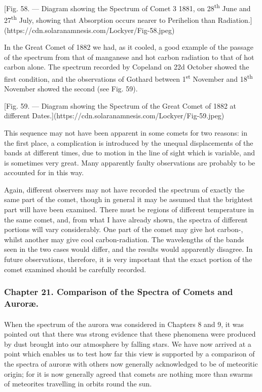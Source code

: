 \documentclass[a4paper, 12pt, oneside, polutonikogreek, english]{article}
\begin{document}
[Fig. 58. --- Diagram showing the Spectrum of Comet 3 1881, on 28\textsuperscript{th} June and 27\textsuperscript{th} July, showing that Absorption occurs nearer to Perihelion than Radiation.](https://cdn.solaranamnesis.com/Lockyer/Fig-58.jpeg)

In the Great Comet of 1882 we had, as it cooled, a good example of the passage of the spectrum from that of manganese and hot carbon radiation to that of hot carbon alone. The spectrum recorded by Copeland on 22d October showed the first condition, and the observations of Gothard between 1\textsuperscript{st} November and 18\textsuperscript{th} November showed the second (see Fig. 59).

[Fig. 59. --- Diagram showing the Spectrum of the Great Comet of 1882 at different Dates.](https://cdn.solaranamnesis.com/Lockyer/Fig-59.jpeg)

This sequence may not have been apparent in some comets for two reasons: in the first place, a complication is introduced by the unequal displacements of the bands at different times, due to motion in the line of sight which is variable, and is sometimes very great. Many apparently faulty observations are probably to be accounted for in this way.

Again, different observers may not have recorded the spectrum of exactly the same part of the comet, though in general it may be assumed that the brightest part will have been examined. There must be regions of different temperature in the same comet, and, from what I have already shown, the spectra of different portions will vary considerably. One part of the comet may give hot carbon-, whilst another may give cool carbon-radiation. The wavelengths of the bands seen in the two cases would differ, and the results would apparently disagree. In future observations, therefore, it is very important that the exact portion of the comet examined should be carefully recorded.
\clearpage
\subsubsection{Chapter 21. Comparison of the Spectra of Comets and Auroræ.}
\paragraph{}
When the spectrum of the aurora was considered in Chapters 8 and 9, it was pointed out that there was strong evidence that these phenomena were produced by dust brought into our atmosphere by falling stars. We have now arrived at a point which enables us to test how far this view is supported by a comparison of the spectra of auroræ with others now generally acknowledged to be of meteoritic origin; for it is now generally agreed that comets are nothing more than swarms of meteorites travelling in orbits round the sun.
\end{document}
